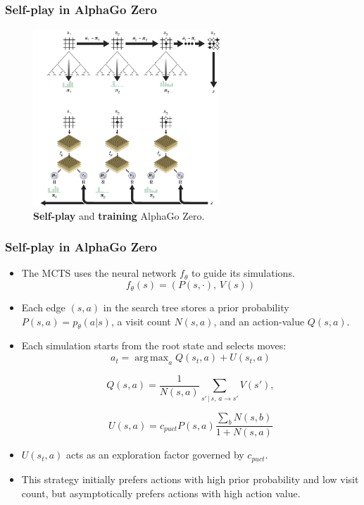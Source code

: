 \documentclass[9pt]{beamer}
\DeclareMathOperator*{\argmax}{arg\,max}
\begin{document}
\begin{frame}
	\frametitle{Self-play in AlphaGo Zero}
		
	\begin{figure}[H]
		\centering
		\includegraphics[width=7cm]{alpha_go_zero_training.png}
		
		\caption{
			\textbf{Self-play} and \textbf{training} AlphaGo Zero.\cite{Silver_2016}
			}
		\label{fig:alpha-zero-self_play}
	\end{figure}
\end{frame}


\begin{frame}
	\frametitle{Self-play in AlphaGo Zero}
	\begin{itemize}
		\item The MCTS uses the neural network $f_\theta$ to guide its simulations.
		$$f_\theta(s) = (P(s, \cdot), \, V(s))$$
		\item Each edge $(s, a)$ in the search tree stores a prior probability $P(s, a) = p_\theta(a | s)$, a visit count $N(s, a)$, and an action-value $Q(s, a)$.
	
	\item Each simulation starts from the root state and selects moves:
	\begin{equation}
		a_t  = \argmax_a{Q(s_t,a) + U(s_t,a)}
	\end{equation}

	\begin{equation}
		Q(s, a) = \frac{1}{N(s,a)} \sum_{s'\, | \, s,\, a \rightarrow s'}{V(s')},
	\end{equation}

	\begin{equation}
		U(s, a) = c_{puct}P(s, a)\frac{\sum_b N(s,b)}{1+N(s,a)}
	\end{equation}

	\item $U(s_t,a)$ acts as an exploration factor governed by $c_{puct}$.
	\item This strategy initially prefers actions with high prior probability and low visit count, but asymptotically prefers actions with high action value.
	\end{itemize}
\end{frame}
\end{document}
